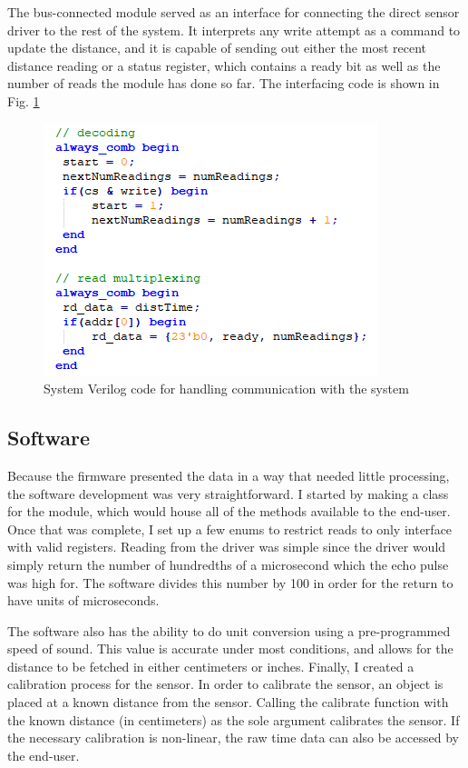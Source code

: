 \documentclass{article}
\begin{document}
	The bus-connected module served as an interface for connecting the direct sensor driver to the rest of the system. It interprets any write attempt as a command to update the distance, and it is capable of sending out either the most recent distance reading or a status register, which contains a ready bit as well as the number of reads the module has done so far. The interfacing code is shown in Fig. \ref{fig:interface}
	
	 \begin{figure}[H]
		\centering
		\includegraphics[width=.6\linewidth]{interface}
		\caption{System Verilog code for handling communication with the system}
		\label{fig:interface}
	\end{figure}
	
	\subsection*{Software}
	
	Because the firmware presented the data in a way that needed little processing, the software development was very straightforward. I started by making a class for the module, which would house all of the methods available to the end-user. Once that was complete, I set up a few enums to restrict reads to only interface with valid registers. Reading from the driver was simple since the driver would simply return the number of hundredths of a microsecond which the echo pulse was high for. The software divides this number by 100 in order for the return to have units of microseconds.
	
	The software also has the ability to do unit conversion using a pre-programmed speed of sound. This value is accurate under most conditions, and allows for the distance to be fetched in either centimeters or inches. Finally, I created a calibration process for the sensor. In order to calibrate the sensor, an object is placed at a known distance from the sensor. Calling the calibrate function with the known distance (in centimeters) as the sole argument calibrates the sensor. If the necessary calibration is non-linear, the raw time data can also be accessed by the end-user.
	
\end{document}
